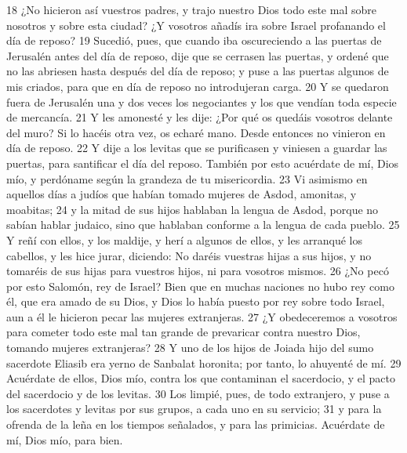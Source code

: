 18 ¿No hicieron así vuestros padres, y trajo nuestro Dios todo este mal sobre nosotros y sobre esta ciudad? ¿Y vosotros añadís ira sobre Israel profanando el día de reposo?
19 Sucedió, pues, que cuando iba oscureciendo a las puertas de Jerusalén antes del día de reposo, dije que se cerrasen las puertas, y ordené que no las abriesen hasta después del día de reposo; y puse a las puertas algunos de mis criados, para que en día de reposo no introdujeran carga.
20 Y se quedaron fuera de Jerusalén una y dos veces los negociantes y los que vendían toda especie de mercancía.
21 Y les amonesté y les dije: ¿Por qué os quedáis vosotros delante del muro? Si lo hacéis otra vez, os echaré mano. Desde entonces no vinieron en día de reposo.
22 Y dije a los levitas que se purificasen y viniesen a guardar las puertas, para santificar el día del reposo. También por esto acuérdate de mí, Dios mío, y perdóname según la grandeza de tu misericordia.
23 Vi asimismo en aquellos días a judíos que habían tomado mujeres de Asdod, amonitas, y moabitas;
24 y la mitad de sus hijos hablaban la lengua de Asdod, porque no sabían hablar judaico, sino que hablaban conforme a la lengua de cada pueblo.
25 Y reñí con ellos, y los maldije, y herí a algunos de ellos, y les arranqué los cabellos, y les hice jurar, diciendo: No daréis vuestras hijas a sus hijos, y no tomaréis de sus hijas para vuestros hijos, ni para vosotros mismos. 
26 ¿No pecó por esto Salomón, rey de Israel? Bien que en muchas naciones no hubo rey como él, que era amado de su Dios, y Dios lo había puesto por rey sobre todo Israel, aun a él le hicieron pecar las mujeres extranjeras. 
27 ¿Y obedeceremos a vosotros para cometer todo este mal tan grande de prevaricar contra nuestro Dios, tomando mujeres extranjeras?
28 Y uno de los hijos de Joiada hijo del sumo sacerdote Eliasib era yerno de Sanbalat horonita; por tanto, lo ahuyenté de mí.
29 Acuérdate de ellos, Dios mío, contra los que contaminan el sacerdocio, y el pacto del sacerdocio y de los levitas.
30 Los limpié, pues, de todo extranjero, y puse a los sacerdotes y levitas por sus grupos, a cada uno en su servicio;
31 y para la ofrenda de la leña en los tiempos señalados, y para las primicias. Acuérdate de mí, Dios mío, para bien.

